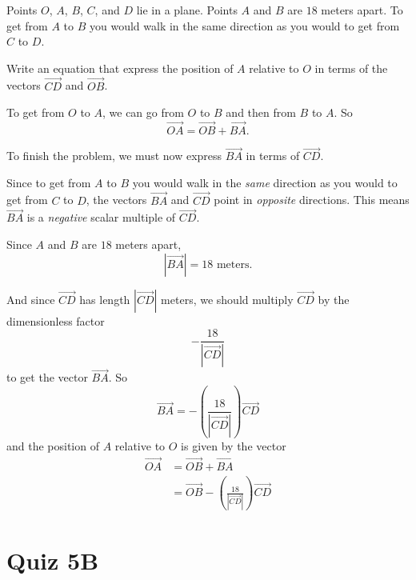 \documentclass{ximera}
\begin{document}
\begin{question} \label{Qpvme}
Points $O$, $A$, $B$, $C$, and $D$ lie in a plane. Points $A$ and $B$ are $18$ meters apart. To get from $A$ to $B$ you would walk in the same direction as you would to get from $C$ to $D$.

Write an equation that express the position of $A$ relative to $O$ in terms of the vectors $\overrightarrow{CD}$ and $\overrightarrow{OB}$.

\begin{explanation}
To get from $O$ to $A$, we can go from $O$ to $B$ and then from $B$ to $A$. So 
\[
  \overrightarrow{OA} = \overrightarrow{OB} + \overrightarrow{BA}.
\]

To finish the problem, we must now express $\overrightarrow{BA}$ in terms of $\overrightarrow{CD}$.

Since to get from $A$ to $B$ you would walk in the \emph{same} direction as you would to get from $C$ to $D$, the vectors $\overrightarrow{BA}$ and $\overrightarrow{CD}$ point in \emph{opposite} directions. This means $\overrightarrow{BA}$ is a \emph{negative} scalar multiple of $\overrightarrow{CD}$.

Since $A$ and $B$ are $18$ meters apart, 
\[
  \left|  \overrightarrow{BA}\right| = 18 \text{ meters}.
\]

And since $\overrightarrow{CD}$ has length $\left| \overrightarrow{CD}\right|$ meters, we should multiply $\overrightarrow{CD}$ by the dimensionless factor
\[
       - \frac{18}{\left| \overrightarrow{CD}\right|}  
\]
to get the vector $\overrightarrow{BA}$. So
\[
     \overrightarrow{BA} =- \left( \frac{18}{\left| \overrightarrow{CD}\right|} \right) \overrightarrow{CD}
\]
and the position of $A$ relative to $O$ is given by the vector
\begin{align*}
   \overrightarrow{OA} &= \overrightarrow{OB} + \overrightarrow{BA} \\
                                 &=\overrightarrow{OB} - \left( \frac{18}{\left| \overrightarrow{CD}\right|} \right) \overrightarrow{CD}
\end{align*}

\end{explanation}
\end{question}

\section{Quiz 5B}
\end{document}
